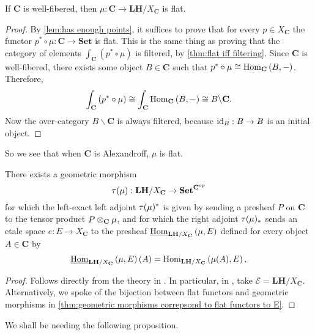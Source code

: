 \begin{lemma*}
\label{lem:well-fibered implies flat}
If $\mathbf{C}$ is well-fibered, then $\mu : \mathbf{C} \to \mathbf{LH}/X_{\mathbf{C}}$ is flat.
\end{lemma*}
\begin{proof}
By \cref{lem:has enough points}, it suffices to prove that for every $p \in X_{\mathbf{C}}$ the functor $p^* \circ \mu : \mathbf{C} \to \mathbf{Set}$ is flat. This is the same thing as proving that the category of elements $\int_{\mathbf{C}} \left( p^* \circ \mu \right)$ is filtered, by \cref{thm:flat iff filtering}. Since $\mathbf{C}$ is well-fibered, there exists some object $B \in \mathbf{C}$ such that $p^* \circ \mu \cong \operatorname{Hom}_{\mathbf{C}}\left(B,-\right)$. Therefore,
\[ \int_\mathbf{C} \left( p^* \circ \mu \right) \cong \int_{\mathbf{C}} \operatorname{Hom}_{\mathbf{C}}\left(B, - \right) \cong B \backslash \mathbf{C}. \]
Now the over-category $B \backslash \mathbf{C}$ is always filtered, because $\operatorname{id}_B : B \to B$ is an initial object.
\end{proof}

So we see that when $\mathbf{C}$ is Alexandroff, $\mu$ is flat.

\begin{proposition*}
\label{prop:the geometric morphism induced by ST}
There exists a geometric morphism
\[ \tau(\operatorname{\mu}) : \mathbf{LH}/X_{\mathbf{C}} \to \mathbf{Set}^{\mathbf{C}^{op}} \]
for which the left-exact left adjoint $\tau(\operatorname{\mu})^*$ is given by sending a presheaf $P$ on $\mathbf{C}$ to the tensor product $P \otimes_{\mathbf{C}} \operatorname{\mu}$, and for which the right adjoint $\tau(\operatorname{\mu})_*$ sends an etale space $e : E \to X_{\mathbf{C}}$ to the presheaf $\underline{\operatorname{Hom}}_{\mathbf{LH}/X_{\mathbf{C}}}\left(\operatorname{\mu}, E\right)$ defined for every object $A \in \mathbf{C}$ by
\[ \underline{\operatorname{Hom}}_{\mathbf{LH}/X_{\mathbf{C}}}\left(\operatorname{\mu}, E \right)(A) = \operatorname{Hom}_{\mathbf{LH}/X_{\mathbf{C}}}\left(\operatorname{\mu}(A), E \right). \]
\end{proposition*}
\begin{proof}
Follows directly from the theory in \cite[Chapter VII, Paragraph 7]{MacLaneMoerdijk91}. In particular, in \cite[Theorem VII.7.2]{MacLaneMoerdijk91}, take $\mathscr{E} = \mathbf{LH}/X_{\mathbf{C}}$. Alternatively, we spoke of the bijection between flat functors and geometric morphisms in \cref{thm:geometric morphisms correpsond to flat functors to E}.
\end{proof}

We shall be needing the following proposition.

